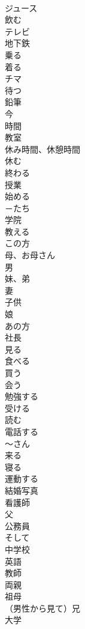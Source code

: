 \documentclass[8pt]{extreport}
\begin{document}
\begin{CJK}{UTF8}{min}
\\	ジュース
\\	飲む
\\	テレビ
\\	地下鉄
\\	乗る
\\	着る
\\	チマ
\\	待つ
\\	鉛筆
\\	今
\\	時間
\\	教室
\\	休み時間、休憩時間
\\	休む
\\	終わる
\\	授業
\\	始める
\\	－たち
\\	学院
\\	教える
\\	この方
\\	母、お母さん
\\	男
\\	妹、弟
\\	妻
\\	子供
\\	娘
\\	あの方
\\	社長
\\	見る
\\	食べる
\\	買う
\\	会う
\\	勉強する
\\	受ける
\\	読む
\\	電話する
\\	～さん
\\	来る
\\	寝る
\\	運動する
\\	結婚写真
\\	看護師
\\	父
\\	公務員
\\	そして
\\	中学校
\\	英語
\\	教師
\\	両親
\\	祖母
\\	（男性から見て）兄
\\	大学

\end{CJK}
\end{document}
